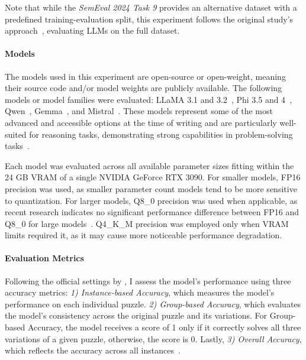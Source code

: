 Note that while the \textit{SemEval 2024 Task 9} provides an alternative dataset with a predefined training-evaluation split, this experiment follows the original study's approach~\cite{jiangBRAINTEASERLateralThinking2023}, evaluating \acp{LLM} on the full dataset.

\paragraph{Models}
The models used in this experiment are open-source or open-weight, meaning their source code and/or model weights are publicly available. The following models or model families were evaluated: \ac{LLaMA} 3.1 and 3.2~\cite{grattafioriLlama3Herd2024}, \acs{Phi} 3.5 and 4~\cite{abdinPhi3TechnicalReport2024, abdinPhi4TechnicalReport2024}, \acs{Qwen}~\cite{qwenQwen25TechnicalReport2025}, \acs{Gemma}~\cite{teamGemma2Improving2024}, and \acs{Mistral}~\cite{MistralNeMoMistral}. These models represent some of the most advanced and accessible options at the time of writing and are particularly well-suited for reasoning tasks, demonstrating strong capabilities in problem-solving tasks~\cite{grattafioriLlama3Herd2024, abdinPhi3TechnicalReport2024, abdinPhi4TechnicalReport2024, qwenQwen25TechnicalReport2025, teamGemma2Improving2024, MistralNeMoMistral}.

Each model was evaluated across all available parameter sizes fitting within the 24 GB \ac{VRAM} of a single NVIDIA GeForce RTX 3090. For smaller models, FP16 precision was used, as smaller parameter count models tend to be more sensitive to quantization. For larger models, Q8\_0 precision was used when applicable, as recent research indicates no significant performance difference between FP16 and Q8\_0 for large models~\cite{raubaQuantifyingPerturbationImpacts2024, liEvaluatingQuantizedLarge2024}. Q4\_K\_M precision was employed only when VRAM limits required it, as it may cause more noticeable performance degradation.

\paragraph{Evaluation Metrics}
Following the official settings by \textcite{jiangBRAINTEASERLateralThinking2023}, I assess the model's performance using three accuracy metrics: \textit{1) Instance-based Accuracy}, which measures the model's performance on each individual puzzle. \textit{2) Group-based Accuracy}, which evaluates the model's consistency across the original puzzle and its variations. For Group-based Accuracy, the model receives a score of 1 only if it correctly solves all three variations of a given puzzle, otherwise, the score is 0. Lastly, \textit{3) Overall Accuracy}, which reflects the accuracy across all instances~\cite{jiangBRAINTEASERLateralThinking2023}.

